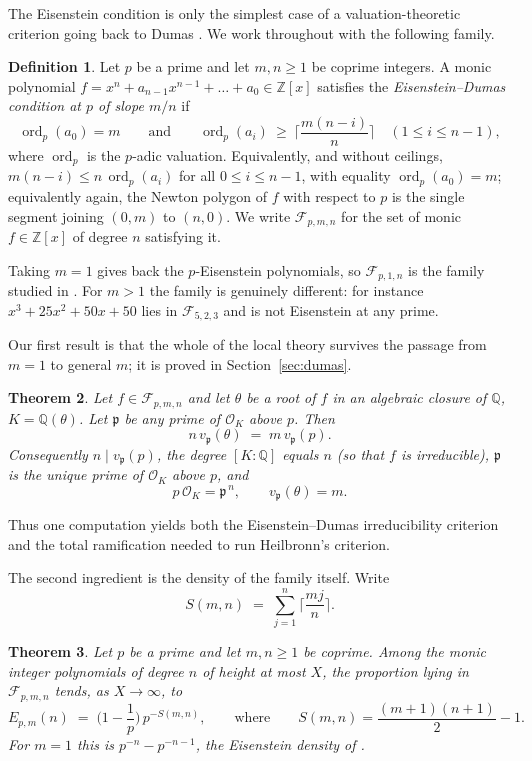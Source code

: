 \documentclass[11pt,reqno]{amsart}
\theoremstyle{plain}
\newtheorem{theorem}{Theorem}[section]
\theoremstyle{definition}
\newtheorem{definition}[theorem]{Definition}
\theoremstyle{remark}
\newcommand{\Z}{\mathbb{Z}}
\newcommand{\Q}{\mathbb{Q}}
\newcommand{\OK}{\mathcal{O}_K}
\newcommand{\vp}{v_{\mathfrak{p}}}
\newcommand{\ord}{\operatorname{ord}}
\newcommand{\p}{\mathfrak{p}}
\begin{document}
The Eisenstein condition is only the simplest case of a valuation-theoretic criterion going back
to Dumas \cite{Dumas}. We work throughout with the following family.

\begin{definition}\label{def:ED}
Let $p$ be a prime and let $m,n\ge1$ be coprime integers. A monic polynomial
$f=x^n+a_{n-1}x^{n-1}+\dots+a_0\in\Z[x]$ satisfies the \emph{Eisenstein--Dumas condition at $p$ of
slope $m/n$} if
\[
  \ord_p(a_0)=m
  \qquad\text{and}\qquad
  \ord_p(a_i)\ \ge\ \Big\lceil \frac{m(n-i)}{n}\Big\rceil \quad (1\le i\le n-1),
\]
where $\ord_p$ is the $p$-adic valuation. Equivalently, and without ceilings,
$m(n-i)\le n\,\ord_p(a_i)$ for all $0\le i\le n-1$, with equality $\ord_p(a_0)=m$; equivalently again,
the Newton polygon of $f$ with respect to $p$ is the single segment joining $(0,m)$ to $(n,0)$.
We write $\mathcal F_{p,m,n}$ for the set of monic $f \in \Z[x]$ of degree $n$ satisfying it.
\end{definition}

Taking $m=1$ gives back the $p$-Eisenstein polynomials, so $\mathcal F_{p,1,n}$ is the family
studied in \cite{HMT}. For $m>1$ the family is genuinely different: for instance
$x^3+25x^2+50x+50$ lies in $\mathcal F_{5,2,3}$ and is not Eisenstein at any prime.

Our first result is that the whole of the local theory survives the passage from $m=1$ to general
$m$; it is proved in Section~\ref{sec:dumas}.

\begin{theorem}\label{thm:main-ram}
Let $f \in \mathcal F_{p,m,n}$ and let $\theta$ be a root of $f$ in an algebraic closure of $\Q$,
$K=\Q(\theta)$. Let $\p$ be any prime of $\OK$ above $p$. Then
\[
  n\,\vp(\theta) \;=\; m\,\vp(p).
\]
Consequently $n\mid \vp(p)$, the degree $[K:\Q]$ equals $n$ (so that $f$ is irreducible), $\p$ is
the unique prime of $\OK$ above $p$, and
\[
  p\,\OK=\p^{\,n},\qquad \vp(\theta)=m .
\]
\end{theorem}

Thus one computation yields both the Eisenstein--Dumas irreducibility criterion and the total
ramification needed to run Heilbronn's criterion.

The second ingredient is the density of the family itself. Write
\[
  S(m,n)\;=\;\sum_{j=1}^{n}\Big\lceil \frac{mj}{n}\Big\rceil .
\]

\begin{theorem}\label{thm:main-density-family}
Let $p$ be a prime and let $m,n\ge1$ be coprime. Among the monic integer polynomials of degree $n$
of height at most $X$, the proportion lying in $\mathcal F_{p,m,n}$ tends, as $X\to\infty$, to
\[
  E_{p,m}(n)\;=\;\Big(1-\frac1p\Big)\,p^{-S(m,n)},
  \qquad\text{where}\qquad
  S(m,n)=\frac{(m+1)(n+1)}{2}-1 .
\]
For $m=1$ this is $p^{-n}-p^{-n-1}$, the Eisenstein density of \cite{Dubickas}.
\end{theorem}
\end{document}
